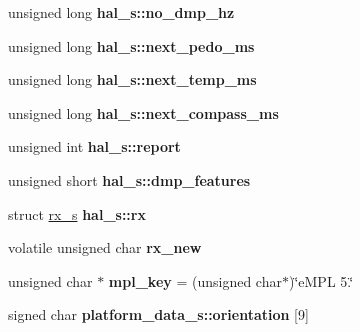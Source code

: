 \begin{DoxyCompactItemize}
\item 
\hypertarget{group__e_m_p_l_gaac7ee68b2364db0bb34d2185d37a510f}{}unsigned long {\bfseries hal\+\_\+s\+::no\+\_\+dmp\+\_\+hz}\label{group__e_m_p_l_gaac7ee68b2364db0bb34d2185d37a510f}

\item 
\hypertarget{group__e_m_p_l_ga2c4d027b190f5f4cd1518c6331b88a86}{}unsigned long {\bfseries hal\+\_\+s\+::next\+\_\+pedo\+\_\+ms}\label{group__e_m_p_l_ga2c4d027b190f5f4cd1518c6331b88a86}

\item 
\hypertarget{group__e_m_p_l_gac1761962f130f7dd8065b5cc73fb58b0}{}unsigned long {\bfseries hal\+\_\+s\+::next\+\_\+temp\+\_\+ms}\label{group__e_m_p_l_gac1761962f130f7dd8065b5cc73fb58b0}

\item 
\hypertarget{group__e_m_p_l_ga1453f27f878d6f8c675ea57b56143af9}{}unsigned long {\bfseries hal\+\_\+s\+::next\+\_\+compass\+\_\+ms}\label{group__e_m_p_l_ga1453f27f878d6f8c675ea57b56143af9}

\item 
\hypertarget{group__e_m_p_l_gafb36436c48c41d572db54d167140ae03}{}unsigned int {\bfseries hal\+\_\+s\+::report}\label{group__e_m_p_l_gafb36436c48c41d572db54d167140ae03}

\item 
\hypertarget{group__e_m_p_l_gaddd6cb7910e57a7196ac6ce64aa0f707}{}unsigned short {\bfseries hal\+\_\+s\+::dmp\+\_\+features}\label{group__e_m_p_l_gaddd6cb7910e57a7196ac6ce64aa0f707}

\item 
\hypertarget{group__e_m_p_l_gafe5d5719cbbae00426834d2742330553}{}struct \hyperlink{structrx__s}{rx\+\_\+s} {\bfseries hal\+\_\+s\+::rx}\label{group__e_m_p_l_gafe5d5719cbbae00426834d2742330553}

\item 
\hypertarget{group__e_m_p_l_ga5bfb2c29b84492416fe0a885d4664132}{}volatile unsigned char {\bfseries rx\+\_\+new}\label{group__e_m_p_l_ga5bfb2c29b84492416fe0a885d4664132}

\item 
\hypertarget{group__e_m_p_l_ga56d9a02ae0e768d49fd95fd014c47b07}{}unsigned char $\ast$ {\bfseries mpl\+\_\+key} = (unsigned char$\ast$)\char`\"{}e\+M\+P\+L 5.\char`\"{}\label{group__e_m_p_l_ga56d9a02ae0e768d49fd95fd014c47b07}

\item 
\hypertarget{group__e_m_p_l_gaf026bc5493793c52186a72b50bebba87}{}signed char {\bfseries platform\+\_\+data\+\_\+s\+::orientation} \mbox{[}9\mbox{]}\label{group__e_m_p_l_gaf026bc5493793c52186a72b50bebba87}

\end{DoxyCompactItemize}


